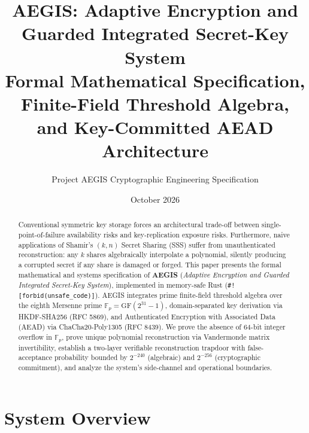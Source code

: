 \documentclass[11pt,a4paper]{article}
\title{\textbf{AEGIS: Adaptive Encryption and Guarded Integrated Secret-Key System}\\
\large Formal Mathematical Specification, Finite-Field Threshold Algebra, and Key-Committed AEAD Architecture}
\author{Project AEGIS Cryptographic Engineering Specification}
\date{October 2026}
\theoremstyle{definition}
\newcommand{\Fp}{\mathbb{F}_p}
\begin{document}
\maketitle

\begin{abstract}
Conventional symmetric key storage forces an architectural trade-off between single-point-of-failure availability risks and key-replication exposure risks. Furthermore, naive applications of Shamir's $(k,n)$ Secret Sharing (SSS) suffer from unauthenticated reconstruction: any $k$ shares algebraically interpolate a polynomial, silently producing a corrupted secret if any share is damaged or forged. This paper presents the formal mathematical and systems specification of \textbf{AEGIS} (\emph{Adaptive Encryption and Guarded Integrated Secret-Key System}), implemented in memory-safe Rust (\texttt{\#![forbid(unsafe\_code)]}). AEGIS integrates prime finite-field threshold algebra over the eighth Mersenne prime $\Fp = \mathrm{GF}(2^{31}-1)$, domain-separated key derivation via HKDF-SHA256 (RFC 5869), and Authenticated Encryption with Associated Data (AEAD) via ChaCha20-Poly1305 (RFC 8439). We prove the absence of 64-bit integer overflow in $\Fp$, prove unique polynomial reconstruction via Vandermonde matrix invertibility, establish a two-layer verifiable reconstruction trapdoor with false-acceptance probability bounded by $2^{-240}$ (algebraic) and $2^{-256}$ (cryptographic commitment), and analyze the system's side-channel and operational boundaries.
\end{abstract}

\tableofcontents
\newpage

\section{System Overview}
\end{document}
